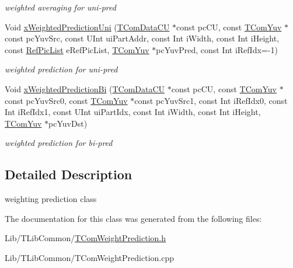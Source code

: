 \begin{DoxyCompactItemize}
\begin{DoxyCompactList}\small\item\em weighted averaging for uni-\/pred \end{DoxyCompactList}\item 
\mbox{\label{class_t_com_weight_prediction_a1e039837266c8b743415d791a50863db}} 
Void \hyperlink{class_t_com_weight_prediction_a1e039837266c8b743415d791a50863db}{x\+Weighted\+Prediction\+Uni} (\hyperlink{class_t_com_data_c_u}{T\+Com\+Data\+CU} $\ast$const pc\+CU, const \hyperlink{class_t_com_yuv}{T\+Com\+Yuv} $\ast$const pc\+Yuv\+Src, const U\+Int ui\+Part\+Addr, const Int i\+Width, const Int i\+Height, const \hyperlink{_type_def_8h_a93cea48eb9dcfd661168dee82e41b384}{Ref\+Pic\+List} e\+Ref\+Pic\+List, \hyperlink{class_t_com_yuv}{T\+Com\+Yuv} $\ast$pc\+Yuv\+Pred, const Int i\+Ref\+Idx=-\/1)
\begin{DoxyCompactList}\small\item\em weighted prediction for uni-\/pred \end{DoxyCompactList}\item 
\mbox{\label{class_t_com_weight_prediction_a15c4853f0a80e8c7558952be68959d91}} 
Void \hyperlink{class_t_com_weight_prediction_a15c4853f0a80e8c7558952be68959d91}{x\+Weighted\+Prediction\+Bi} (\hyperlink{class_t_com_data_c_u}{T\+Com\+Data\+CU} $\ast$const pc\+CU, const \hyperlink{class_t_com_yuv}{T\+Com\+Yuv} $\ast$const pc\+Yuv\+Src0, const \hyperlink{class_t_com_yuv}{T\+Com\+Yuv} $\ast$const pc\+Yuv\+Src1, const Int i\+Ref\+Idx0, const Int i\+Ref\+Idx1, const U\+Int ui\+Part\+Idx, const Int i\+Width, const Int i\+Height, \hyperlink{class_t_com_yuv}{T\+Com\+Yuv} $\ast$pc\+Yuv\+Dst)
\begin{DoxyCompactList}\small\item\em weighted prediction for bi-\/pred \end{DoxyCompactList}\end{DoxyCompactItemize}


\subsection{Detailed Description}
weighting prediction class 

The documentation for this class was generated from the following files\+:\begin{DoxyCompactItemize}
\item 
Lib/\+T\+Lib\+Common/\hyperlink{_t_com_weight_prediction_8h}{T\+Com\+Weight\+Prediction.\+h}\item 
Lib/\+T\+Lib\+Common/T\+Com\+Weight\+Prediction.\+cpp\end{DoxyCompactItemize}
